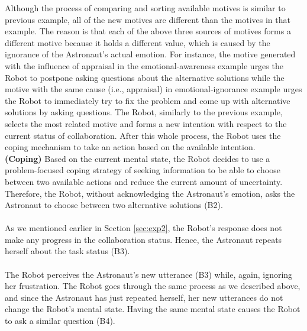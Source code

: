 Although the process of comparing and sorting available motives is similar to
previous example, all of the new motives are different than the motives in that
example. The reason is that each of the above three sources of motives forms a
different motive because it holds a different value, which is caused by the
ignorance of the Astronaut's actual emotion. For instance, the motive generated
with the influence of appraisal in the emotional-awareness example urges the
Robot to postpone asking questions about the alternative solutions while the
motive with the same cause (i.e., appraisal) in emotional-ignorance example
urges the Robot to immediately try to fix the problem and come up with
alternative solutions by asking questions. The Robot, similarly to the previous
example, selects the most related motive and forms a new intention with respect
to the current status of collaboration. After this whole process, the Robot uses
the coping mechanism to take an action based on the available intention.\\

\noindent\textbf{(Coping)} Based on the current mental state, the Robot decides
to use a problem-focused coping strategy of seeking information to be able to
choose between two available actions and reduce the current amount of
uncertainty. Therefore, the Robot, without acknowledging the Astronaut's
emotion, asks the Astronaut to choose between two alternative solutions (B2).\\

\noindent{}\\

As we mentioned earlier in Section \ref{sec:exp2}, the Robot's response does not
make any progress in the collaboration status. Hence, the Astronaut repeats
herself about the task status (B3).\\

\noindent{}\\

The Robot perceives the Astronaut's new utterance (B3) while, again, ignoring
her frustration. The Robot goes through the same process as we described above,
and since the Astronaut has just repeated herself, her new utterances do not
change the Robot's mental state. Having the same mental state causes the Robot
to ask a similar question (B4).\\

